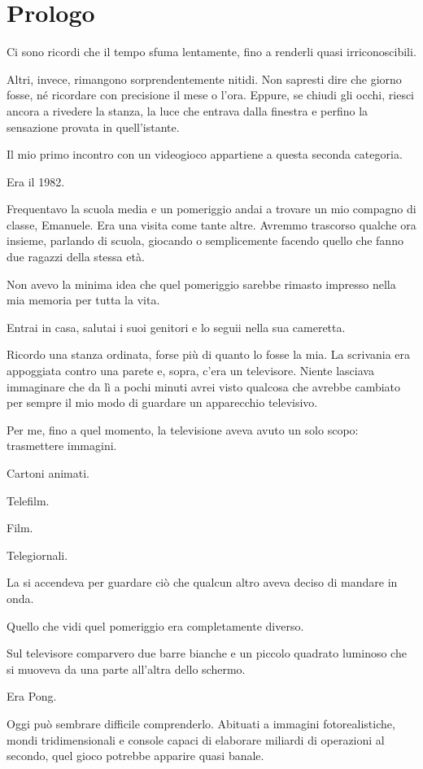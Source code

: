 \documentclass{article}
\author{HP}
\date{2026-07-26}
\begin{document}
\section{Prologo}
Ci sono ricordi che il tempo sfuma lentamente, fino a renderli quasi irriconoscibili.

Altri, invece, rimangono sorprendentemente nitidi. Non sapresti dire che giorno fosse, né ricordare con precisione il
mese o l'ora. Eppure, se chiudi gli occhi, riesci ancora a rivedere la stanza, la luce che entrava dalla finestra e
perfino la sensazione provata in quell'istante.

Il mio primo incontro con un videogioco appartiene a questa seconda categoria.

Era il 1982.

Frequentavo la scuola media e un pomeriggio andai a trovare un mio compagno di classe, Emanuele. Era una visita come
tante altre. Avremmo trascorso qualche ora insieme, parlando di scuola, giocando o semplicemente facendo quello che
fanno due ragazzi della stessa età.

Non avevo la minima idea che quel pomeriggio sarebbe rimasto impresso nella mia memoria per tutta la vita.

Entrai in casa, salutai i suoi genitori e lo seguii nella sua cameretta.

Ricordo una stanza ordinata, forse più di quanto lo fosse la mia. La scrivania era appoggiata contro una parete e,
sopra, c'era un televisore. Niente lasciava immaginare che da lì a pochi minuti avrei visto qualcosa che avrebbe
cambiato per sempre il mio modo di guardare un apparecchio televisivo.

Per me, fino a quel momento, la televisione aveva avuto un solo scopo: trasmettere immagini.

Cartoni animati.

Telefilm.

Film.

Telegiornali.

La si accendeva per guardare ciò che qualcun altro aveva deciso di mandare in onda.

Quello che vidi quel pomeriggio era completamente diverso.

Sul televisore comparvero due barre bianche e un piccolo quadrato luminoso che si muoveva da una parte all'altra dello
schermo.

Era Pong.

Oggi può sembrare difficile comprenderlo. Abituati a immagini fotorealistiche, mondi tridimensionali e console capaci di
elaborare miliardi di operazioni al secondo, quel gioco potrebbe apparire quasi banale.
\end{document}
